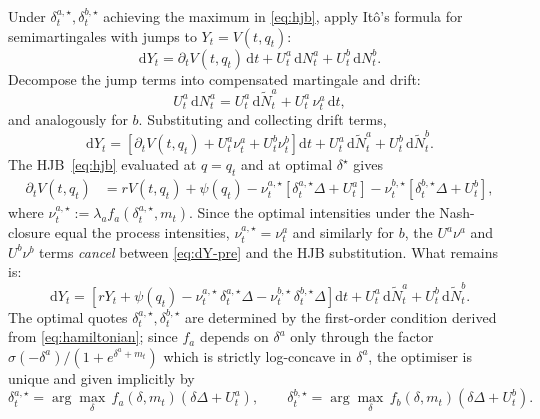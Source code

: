 \documentclass[11pt,a4paper]{article}
\theoremstyle{definition}
\theoremstyle{remark}
\newcommand{\dd}{\mathrm{d}}
\newcommand{\Nt}{\widetilde{N}}
\begin{document}
Under $\delta^{a,\star}_t, \delta^{b,\star}_t$ achieving the maximum in
\eqref{eq:hjb}, apply It\^o's formula for semimartingales with
jumps \citep[Theorem~III.7.32]{oksendal1998} to $Y_t = V(t, q_t)$:
\begin{equation}\label{eq:ito-jump}
\dd Y_t = \partial_t V(t, q_t)\, \dd t
+ U^a_t \, \dd N^a_t + U^b_t \, \dd N^b_t.
\end{equation}
Decompose the jump terms into compensated martingale and drift:
\begin{equation}\label{eq:decompose-jumps}
U^a_t \, \dd N^a_t = U^a_t \, \dd \Nt^a_t + U^a_t \, \nu^a_t \, \dd t,
\end{equation}
and analogously for $b$.  Substituting and collecting drift terms,
\begin{equation}\label{eq:dY-pre}
\dd Y_t = \!\left[\partial_t V(t, q_t) + U^a_t \nu^a_t + U^b_t \nu^b_t \right] \dd t
+ U^a_t \, \dd \Nt^a_t + U^b_t \, \dd \Nt^b_t.
\end{equation}
The HJB~\eqref{eq:hjb} evaluated at $q = q_t$ and at optimal
$\delta^\star$ gives
\begin{align*}
\partial_t V(t, q_t) &= r V(t, q_t) + \psi(q_t)
- \nu^{a,\star}_t \!\left[\delta^{a,\star}_t \Delta + U^a_t \right]
- \nu^{b,\star}_t \!\left[\delta^{b,\star}_t \Delta + U^b_t \right],
\end{align*}
where $\nu^{a,\star}_t := \lambda_a f_a(\delta^{a,\star}_t, m_t)$.
Since the optimal intensities under the Nash-closure equal the
process intensities, $\nu^{a,\star}_t = \nu^a_t$ and similarly
for $b$, the $U^a \nu^a$ and $U^b \nu^b$ terms
\emph{cancel} between \eqref{eq:dY-pre} and the HJB substitution.
What remains is:
\begin{equation}\label{eq:bsdej-drift}
\dd Y_t = \!\left[ r Y_t + \psi(q_t) -
\nu^{a,\star}_t \, \delta^{a,\star}_t \Delta -
\nu^{b,\star}_t \, \delta^{b,\star}_t \Delta \right] \dd t
+ U^a_t \, \dd \Nt^a_t + U^b_t \, \dd \Nt^b_t.
\end{equation}
The optimal quotes $\delta^{a,\star}_t, \delta^{b,\star}_t$ are
determined by the first-order condition derived from
\eqref{eq:hamiltonian}; since $f_a$ depends on $\delta^a$ only
through the factor $\sigma(-\delta^a)/(1 + e^{\delta^a + m_t})$ which
is strictly log-concave in $\delta^a$, the optimiser is unique and
given implicitly by
\begin{equation}\label{eq:foc}
\delta^{a,\star}_t = \arg\max_\delta\, f_a(\delta, m_t)(\delta \Delta + U^a_t),
\qquad
\delta^{b,\star}_t = \arg\max_\delta\, f_b(\delta, m_t)(\delta \Delta + U^b_t).
\end{equation}
\end{document}
